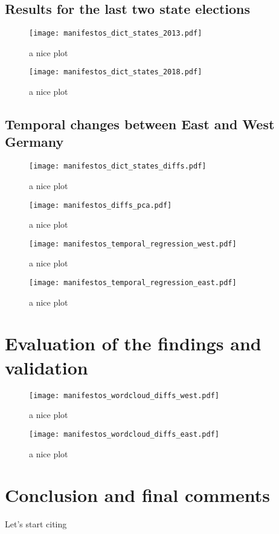 \documentclass[a4paper]{scrreprt}
\begin{document}
\section{Results for the last two state elections}
\begin{figure}
    \centering
    \texttt{[image: manifestos\_dict\_states\_2013.pdf]}
    \caption{a nice plot}
\end{figure}
\begin{figure}
    \centering
    \texttt{[image: manifestos\_dict\_states\_2018.pdf]}
    \caption{a nice plot}
\end{figure}
\section{Temporal changes between East and West Germany}
\begin{figure}
    \centering
    \texttt{[image: manifestos\_dict\_states\_diffs.pdf]}
    \caption{a nice plot}
\end{figure}
\begin{figure}
    \centering
    \texttt{[image: manifestos\_diffs\_pca.pdf]}
    \caption{a nice plot}
\end{figure}
\begin{figure}
    \centering
    \texttt{[image: manifestos\_temporal\_regression\_west.pdf]}
    \caption{a nice plot}
\end{figure}
\begin{figure}
    \centering
    \texttt{[image: manifestos\_temporal\_regression\_east.pdf]}
    \caption{a nice plot}
\end{figure}
\chapter{Evaluation of the findings and validation}
\begin{figure}
    \centering
    \texttt{[image: manifestos\_wordcloud\_diffs\_west.pdf]}
    \caption{a nice plot}
\end{figure}
\begin{figure}
    \centering
    \texttt{[image: manifestos\_wordcloud\_diffs\_east.pdf]}
    \caption{a nice plot}
\end{figure}
\chapter{Conclusion and final comments}
Let's start citing \citep[p.~22]{canovan:2002}


\end{document}
